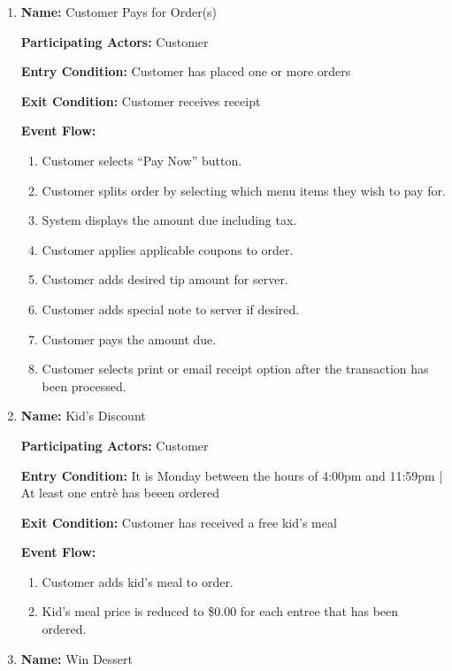 \documentclass[11pt]{article}
\begin{document}
\begin{enumerate}
		\item \textbf{Name:} 				Customer Pays for Order(s)

			\textbf{Participating Actors:} 	Customer

			\textbf{Entry Condition:} 		Customer has placed one or more orders

			\textbf{Exit Condition:} 		Customer receives receipt

			\textbf{Event Flow:}
			\begin{enumerate}
				\setlength{\leftskip}{1cm}
				\item Customer selects “Pay Now” button.
				\item Customer splits order by selecting which menu items they wish to pay for.
				\item System displays the amount due including tax.
				\item Customer applies applicable coupons to order.
				\item Customer adds desired tip amount for server.
				\item Customer adds special note to server if desired.
				\item Customer pays the amount due.
				\item Customer selects print or email receipt option after the transaction has been processed.\\
			\end{enumerate}

		\newpage

		\item \textbf{Name:} 				Kid's Discount

			\textbf{Participating Actors:} 	Customer

			\textbf{Entry Condition:} 		It is Monday between the hours of 4:00pm and 11:59pm | At least one entr\`e has beeen ordered

			\textbf{Exit Condition:} 		Customer has received a free kid's meal

			\textbf{Event Flow:}
			\begin{enumerate}
				\setlength{\leftskip}{1cm}
				\item Customer adds kid's meal to order.
				\item Kid's meal price is reduced to \$0.00 for each entree that has been ordered.\\
			\end{enumerate}

		\item \textbf{Name:} 				Win Dessert


\end{enumerate}
\end{document}
